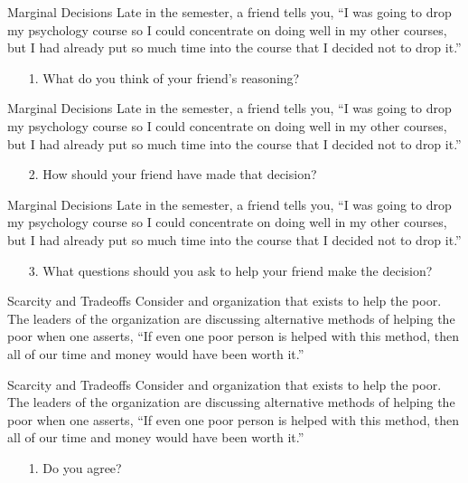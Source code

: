\documentclass{beamer}
\begin{document}
\begin{frame}[t]{Marginal Decisions}
    Late in the semester, a friend tells you, “I was going to drop my psychology course so I could concentrate on doing well in my other courses, but I had already put so much time into the course that I decided not to drop it.”
    \begin{enumerate}
        \item[1.] What do you think of your friend’s reasoning?
    \end{enumerate}
\end{frame}

\begin{frame}[t]{Marginal Decisions}
    Late in the semester, a friend tells you, “I was going to drop my psychology course so I could concentrate on doing well in my other courses, but I had already put so much time into the course that I decided not to drop it.”
    \begin{enumerate}
        \item[2.] How should your friend have made that decision?
    \end{enumerate}
\end{frame}

\begin{frame}[t]{Marginal Decisions}
    Late in the semester, a friend tells you, “I was going to drop my psychology course so I could concentrate on doing well in my other courses, but I had already put so much time into the course that I decided not to drop it.”
    \begin{enumerate}
        \item[3.] What questions should you ask to help your friend make the decision?
    \end{enumerate}
\end{frame}

\begin{frame}{Scarcity and Tradeoffs}
    Consider and organization that exists to help the poor. The leaders of the organization are discussing alternative methods of helping the poor when one asserts, “If even one poor person is helped with this method, then all of our time and money would have been worth it.”
\end{frame}

\begin{frame}[t]{Scarcity and Tradeoffs}
    Consider and organization that exists to help the poor. The leaders of the organization are discussing alternative methods of helping the poor when one asserts, “If even one poor person is helped with this method, then all of our time and money would have been worth it.”
    \begin{enumerate}
        \item[1.] Do you agree? 
    \end{enumerate}
\end{frame}
\end{document}
